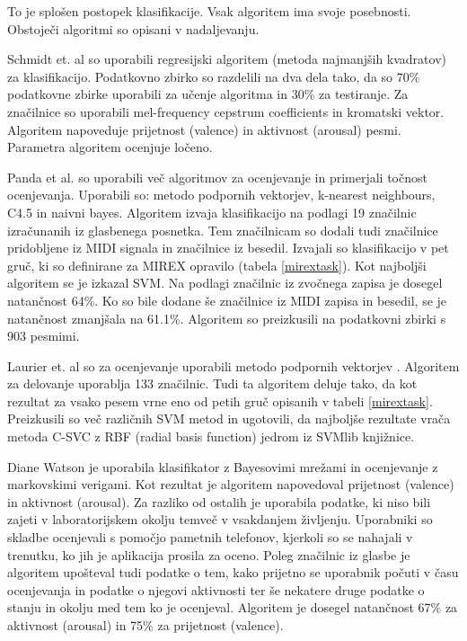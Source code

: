 \documentclass[a4paper, 12pt]{book}
\begin{document}
{To je splošen postopek klasifikacije. Vsak algoritem ima svoje posebnosti. Obstoječi algoritmi so opisani v nadaljevanju. 

Schmidt et. al \cite{schmidt2009projection} so uporabili regresijski algoritem (metoda najmanjših kvadratov) za klasifikacijo. Podatkovno zbirko so razdelili na dva dela tako, da so 70\% podatkovne zbirke uporabili za učenje algoritma in 30\% za testiranje. Za značilnice so uporabili mel-frequency cepstrum coefficients in kromatski vektor. Algoritem napoveduje prijetnost (valence) in aktivnost (arousal) pesmi. Parametra algoritem ocenjuje ločeno. 

Panda et al. \cite{panda2013multi} so uporabili več algoritmov za ocenjevanje in primerjali točnost ocenjevanja. Uporabili so: metodo podpornih vektorjev, k-nearest neighbours, C4.5 in naivni bayes. Algoritem izvaja klasifikacijo na podlagi 19 značilnic izračunanih iz glasbenega posnetka. Tem značilnicam so dodali tudi značilnice pridobljene iz MIDI signala in značilnice iz besedil. Izvajali so klasifikacijo v pet gruč, ki so definirane za MIREX opravilo (tabela \ref{mirextask}).  Kot najboljši algoritem se je izkazal SVM. Na podlagi značilnic iz zvočnega zapisa je dosegel natančnost 64\%. Ko so bile dodane še značilnice iz MIDI zapisa in besedil, se je natančnost zmanjšala na 61.1\%. Algoritem so preizkusili na podatkovni zbirki s 903 pesmimi. 

Laurier et. al \cite{laurier2007audio} so za ocenjevanje uporabili metodo podpornih vektorjev \cite{ben2010user}. Algoritem za delovanje uporablja 133 značilnic. Tudi ta algoritem deluje tako, da kot rezultat za vsako pesem vrne eno od petih gruč opisanih v tabeli \ref{mirextask}. Preizkusili so več različnih SVM metod in ugotovili, da najboljše rezultate vrača metoda C-SVC z RBF (radial basis function) jedrom iz SVMlib knjižnice. 

Diane Watson \cite{watson2012modeling} je uporabila klasifikator z Bayesovimi mrežami in ocenjevanje z markovskimi verigami. Kot rezultat je algoritem napovedoval prijetnost (valence) in aktivnost (arousal). Za razliko od ostalih je uporabila podatke, ki niso bili zajeti v laboratorijskem okolju temveč v vsakdanjem življenju. Uporabniki so skladbe ocenjevali s pomočjo pametnih telefonov, kjerkoli so se nahajali v trenutku, ko jih je aplikacija prosila za oceno. Poleg značilnic iz glasbe je algoritem upošteval tudi podatke o tem, kako prijetno se uporabnik počuti v času ocenjevanja in podatke o njegovi aktivnosti ter še nekatere druge podatke o stanju in okolju med tem ko je ocenjeval. Algoritem je dosegel natančnost 67\% za aktivnost (arousal) in 75\% za prijetnost (valence). 

}
\end{document}
